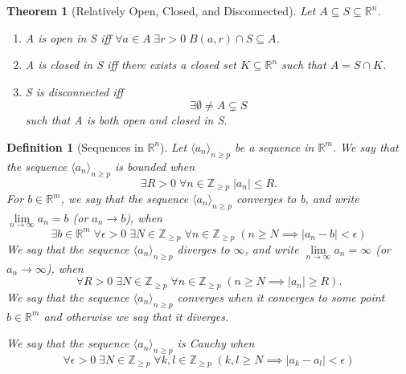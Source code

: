 \documentclass[11pt, oneside]{book}
\theoremstyle{break}
\newtheorem{thm}{Theorem}[section]
\newtheorem{defn}{Definition}[section]
\newcommand{\bb}[1]{\mathbb{#1}}		%
\begin{document}
\begin{thm}[Relatively Open, Closed, and Disconnected]
	Let $A \subseteq S \subseteq \bb{R}^n$.
	\begin{enumerate}
		\item A is open in S iff $\forall a \in A \; \exists r > 0 \; B(a, r) \cap S \subseteq A$.
		\item A is closed in S iff there exists a closed set $K \subseteq \bb{R}^n$ such that $A = S \cap K$.
		\item S is disconnected iff
			\begin{equation*}
				\exists \emptyset \neq A \subsetneq S
			\end{equation*}
			such that A is both open and closed in S.
	\end{enumerate}
\end{thm}

\begin{defn}[Sequences in $\bb{R}^n$]
	Let $\langle a_n \rangle_{n \geq p}$ be a sequence in $\bb{R}^m$. We say that the sequence $\langle a_n \rangle_{n \geq p}$ is bounded when
	\begin{equation*}
		\exists R > 0 \; \forall n \in \bb{Z}_{\geq p} \; |a_n| \leq R.
	\end{equation*}
	For $b \in \bb{R}^m$, we say that the sequence $\langle a_n \rangle_{n \geq p}$ converges to b, and write $\lim\limits_{n \to \infty} a_n = b$ (or $a_n \to b$), when
	\begin{equation*}
		\exists b \in \bb{R}^m \; \forall \epsilon > 0 \; \exists N \in \bb{Z}_{\geq p} \; \forall n \in \bb{Z}_{\geq p} \; (n \geq N \implies |a_n - b| < \epsilon)
	\end{equation*}
	We say that the sequence $\langle a_n \rangle_{n \geq p}$ diverges to $\infty$, and write $\lim\limits_{n \to \infty} a_n = \infty$ (or $a_n \to \infty$), when
	\begin{equation*}
		\forall R > 0 \; \exists N \in \bb{Z}_{\geq p} \; \forall n \in \bb{Z}_{\geq p} \; (n \geq N \implies |a_n| \geq R).
	\end{equation*}
	We say that the sequence $\langle a_n \rangle_{n \geq p}$ converges when it converges to some point $b \in \bb{R}^m$ and otherwise we say that it diverges.

	We say that the sequence $\langle a_n \rangle_{n \geq p}$ is Cauchy when
	\begin{equation*}
		\forall \epsilon > 0 \; \exists N \in \bb{Z}_{\geq p} \; \forall k, l \in \bb{Z}_{\geq p} \; (k, l \geq N \implies |a_k - a_l| < \epsilon)
	\end{equation*}
\end{defn}
\end{document}
